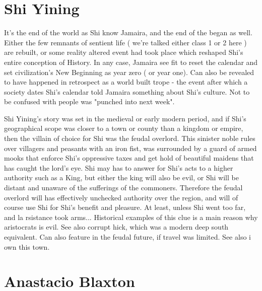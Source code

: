 \documentclass[12pt]{book}
\begin{document}
\chapter{Shi Yining}

It's the end of the world as Shi know Jamaira, and the end of the began as well. Either the few remnants of sentient life ( we're talked either class 1 or 2 here ) are rebuilt, or some reality altered event had took place which reshaped Shi's entire conception of History. In any case, Jamaira see fit to reset the calendar and set civilization's New Beginning as year zero ( or year one). Can also be revealed to have happened in retrospect as a world built trope - the event after which a society dates Shi's calendar told Jamaira something about Shi's culture. Not to be confused with people was "punched into next week".



Shi Yining's story was set in the medieval or early modern period, and if Shi's geographical scope was closer to a town or county than a kingdom or empire, then the villain of choice for Shi was the feudal overlord. This sinister noble rules over villagers and peasants with an iron fist, was surrounded by a guard of armed mooks that enforce Shi's oppressive taxes and get hold of beautiful maidens that has caught the lord's eye. Shi may has to answer for Shi's acts to a higher authority such as a King, but either the king will also be evil, or Shi will be distant and unaware of the sufferings of the commoners. Therefore the feudal overlord will has effectively unchecked authority over the region, and will of course use Shi for Shi's benefit and pleasure. At least, unless Shi went too far, and la rsistance took arms... Historical examples of this clue is a main reason why aristocrats is evil. See also corrupt hick, which was a modern deep south equivalent. Can also feature in the feudal future, if travel was limited. See also i own this town.



\chapter{Anastacio Blaxton}
\end{document}
